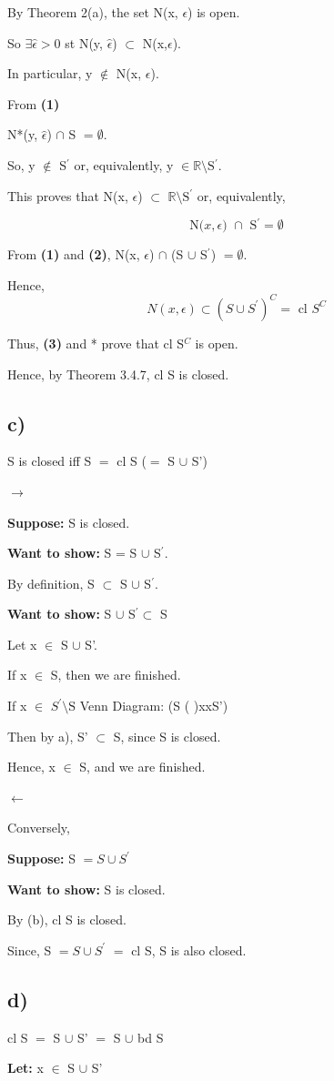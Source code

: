 \documentclass{article}
\newcommand\ssc[2][\DefaultOpt]{%
  \def\DefaultOpt{#2}%
  \subsection[#1]{#2}%
}
\newcommand{\lt}[1]{\textbf{Let: } #1}
\newcommand{\supp}[1]{\textbf{Suppose: } #1}
\newcommand{\wts}[1]{\textbf{Want to show: } #1}
\newcommand{\bpth}[1]{\textbf{(#1)}}
\newcommand{\step}[2]{\begin{equation}\tag{#2}#1\end{equation}}
\newcommand{\br}{\mathbb{R}}       %
\newcommand{\ep}{\epsilon}         %
\newcommand{\es}{\emptyset}        %
\newcommand{\sbs}{\subset}         %
\newcommand{\lra}{\longrightarrow} %
\newcommand{\lla}{\longleftarrow}  %
\newcommand{\pr}{^\prime} 		   %
\newcommand{\butnot}[2]{#1\setminus{\textrm{#2}}}
\newcommand{\nbhe}[3]{\textrm{N(}#1, #2\textrm{) }\cap \textrm{ #3} = \emptyset}
\begin{document}
By Theorem 2(a), the set N(x, $\ep$) is open. \

So $\exists \hat{\epsilon} > 0$ st N(y, $\hat{\epsilon}$) $\subset$ N(x,$\ep$). \

In particular, y $\not\in$ N(x, $\ep$). \

From \bpth{1} \

N*(y, $\hat{\epsilon}$) $\cap$ S $= \emptyset$. \

So, y $\not\in$ S$\pr$ or, equivalently, y $\in \butnot{\br}{S$\pr$}$.

This proves that N(x, $\ep$) $\subset$ $\butnot{\br}{S$\pr$}$ or, equivalently,

\step{\nbhe{x}{\epsilon}{S$\pr$}}{2}

From \bpth{1} and \bpth{2}, N(x, $\ep$) $\cap$ (S $\cup$ S$\pr$) $= \es$. \

Hence, 
\step{N(x, \ep) \sbs (S \cup S\pr)^C = \textrm{ cl }S^C}{3}

Thus, \bpth{3} and * prove that cl S$^C$ is open. \

Hence, by Theorem 3.4.7, cl S is closed.

\ssc{c)} S is closed iff S $=$ cl S ($=$ S $\cup$ S') \

$\lra$ \

\supp{S is closed.}

\wts{S = S $\cup$ S$\pr$.} \

By definition, S $\subset$ S $\cup$ S$\pr$. \

\wts{S $\cup$ S$\pr \subset$ S}

Let x $\in$ S $\cup$ S'. \

If x $\in$ S, then we are finished. \

If x $\in$ $\butnot{S\pr}{S}$ Venn Diagram: (S     (    )xxS') \

Then by a), S' $\subset$ S, since S is closed.

Hence, x $\in$ S, and we are finished.\

$\lla$ \

Conversely, \

\supp{S $= S \cup S\pr$} \

\wts{S is closed.}\

By (b), cl S is closed. \

Since, S $= S \cup S\pr$ $=$ cl S, S is also closed.



\ssc{d)} cl S $=$ S $\cup$ S' $=$ S $\cup$ bd S \

\lt{x $\in$ S $\cup$ S'}
\end{document}
